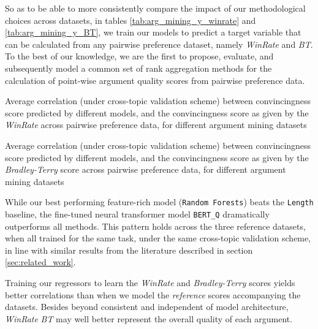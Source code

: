 \documentclass[notitlepage,12pt]{jedm}
\begin{document}
So as to be able to more consistently compare the impact of our methodological 
choices across datasets, in tables \ref{tab:arg_mining_y_winrate} and 
\ref{tab:arg_mining_y_BT}, we 
train our models to predict a target variable that can be calculated from any 
pairwise preference dataset, namely \textit{WinRate} and \textit{BT}.
To the best of our knowledge, we are the first to propose, evaluate, and 
subsequently model a common set of rank aggregation methods for the calculation 
of point-wise argument quality scores from pairwise preference data.

\begin{table}[H]
	\parbox{.45\linewidth}{
		\centering
		
	}
	\hfill
	\parbox{.45\linewidth}{
		\centering
		
	}
	\caption{
		Average correlation (under cross-topic validation scheme) between 
		convincingness score predicted by different models, and the 
		convincingness score as given by the \textit{WinRate} across pairwise 
		preference data, for different argument mining datasets
	}
	\label{tab:arg_mining_y_winrate}
\end{table}


\begin{table}
	\parbox{.45\linewidth}{
		\centering
		
	}
	\hfill
	\parbox{.45\linewidth}{
		\centering
		
	}
	\caption{
		Average correlation (under cross-topic validation scheme) between 
		convincingness score predicted by different models, and the 
		convincingness score as given by the \textit{Bradley-Terry} score 
		across pairwise preference data, for different argument mining datasets
	}
	\label{tab:arg_mining_y_BT}
\end{table}

While our best performing feature-rich model (\verb|Random Forests|) beats the 
\verb|Length| baseline, the fine-tuned neural transformer model \verb|BERT_Q| 
dramatically outperforms all methods.
This pattern holds across the three reference datasets, when all trained for 
the same task, under the same cross-topic validation scheme, in line with 
similar results from the literature described in section \ref{sec:related_work}.

Training our regressors to learn the \textit{WinRate}  and 
\textit{Bradley-Terry} scores yields better correlations than when we model the 
\textit{reference} scores accompanying the datasets.
Besides beyond consistent and independent of model architecture, 
\textit{WinRate} \textit{BT} may well better represent the overall quality of 
each argument.
\end{document}
